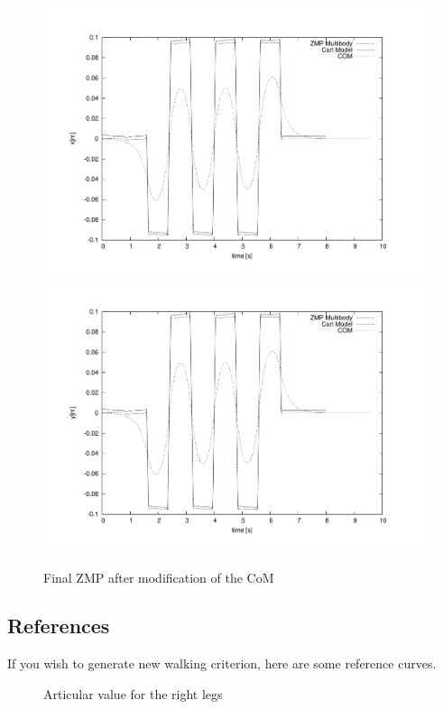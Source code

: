 \begin{figure}[htb]
\begin{center}
\includegraphics[width=\linewidth]{./figures/PatternGenerator/ThirdFigureZMPMB_X}
\includegraphics[width=\linewidth]{./figures/PatternGenerator/ThirdFigureZMPMB_Y}
\caption{Final ZMP after modification of the CoM}
\label{pic:ZMPMBcompensated}
\end{center}
\end{figure}
\clearpage

\subsection{References}
If you wish to generate new walking criterion, here are some reference curves.
\begin{figure}[htb]
\begin{center}
\caption{Articular value for the right legs}
\label{pic:ZMPMBcompensated}
\end{center}
\end{figure}


